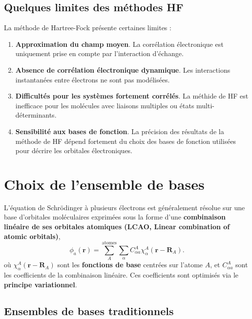 \documentclass[12pt,a4paper]{article} %
\numberwithin{equation}{section} %
\numberwithin{figure}{section} %
\numberwithin{table}{section} %
\begin{document}
\subsection{Quelques limites des méthodes HF}

La méthode de Hartree-Fock présente certaines limites :
\begin{enumerate}
\item \textbf{Approximation du champ moyen}. La corrélation électronique est uniquement prise en compte par l’interaction d’échange.
\item \textbf{Absence de corrélation électronique dynamique}. Les interactions instantanées entre électrons ne sont pas modélisées.
    \item \textbf{Difficultés pour les systèmes fortement corrélés}. La méthide de HF est inefficace pour les molécules avec liaisons multiples ou états multi-déterminants.
\item \textbf{Sensibilité aux bases de fonction}. La précision des résultats de la méthode de HF dépend fortement du choix des bases de fonction utilisées pour décrire les orbitales électroniques.
\end{enumerate}

\section{\label{sec:Base} Choix de l'ensemble de bases}

L'équation de Schrödinger à plusieurs électrons est généralement résolue sur une base d'orbitales moléculaires exprimées sous la forme d'une \textbf{combinaison linéaire de ses orbitales atomiques (LCAO, Linear combination of atomic orbitals)}, 
\begin{equation}
     \phi_a(\mathbf{r}) =
     \sum_A^\mathrm{atomes}
     \sum_\alpha C^A_{\alpha a}
     \chi^A_{\alpha}(\mathbf{r} - \mathbf{R}_A) .
\end{equation}
où $\chi^A_{\alpha}(\mathbf{r} - \mathbf{R}_A)$ sont les \textbf{fonctions de base} centrées sur l’atome $A$, et $C^A_{\alpha a}$ sont les coefficients de la combinaison linéaire. Ces coefficients sont optimisés via le \textbf{principe variationnel}.

\subsection{Ensembles de bases traditionnels}
\end{document}

